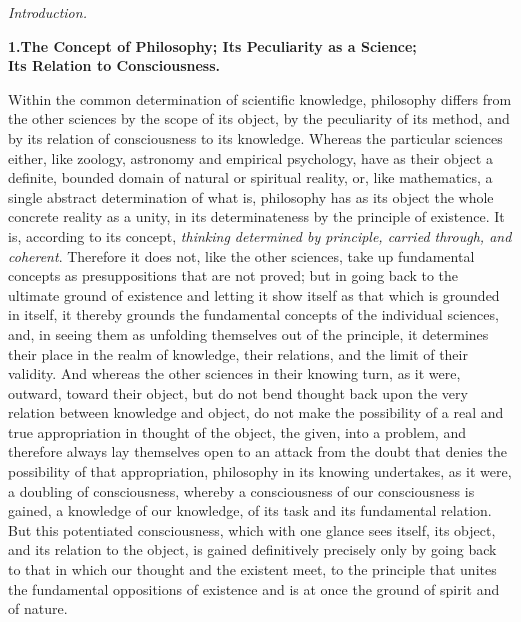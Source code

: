 \divrule

\begin{center}
{\Large\emph{Introduction.}}
\end{center}

\divrule

\begin{center}
\textbf{1.\enspace The Concept of Philosophy; Its Peculiarity as a Science;\\
Its Relation to Consciousness.}
\end{center}

Within the common determination of scientific knowledge, philosophy
differs from the other sciences by the scope of its object, by the
peculiarity of its method, and by its relation of consciousness to its
knowledge. Whereas the particular sciences either, like zoology,
astronomy and empirical psychology, have as their object a definite,
bounded domain of natural or spiritual reality, or, like mathematics, a
single abstract determination of what is, philosophy has as its object
the whole concrete reality as a unity, in its determinateness by the
principle of existence. It is, according to its concept, \emph{thinking
determined by principle, carried through, and coherent}. Therefore it
does not, like the other sciences, take up fundamental concepts as
presuppositions that are not proved; but in going back to the ultimate
ground of existence and letting it show itself as that which is grounded
in itself, it thereby grounds the fundamental concepts of the individual
sciences, and, in seeing them as unfolding themselves out of the
principle, it determines their place in the realm of knowledge, their
relations, and the limit of their validity. And whereas the other
sciences in their knowing turn, as it were, outward, toward their
object, but do not bend thought back upon the very relation between
knowledge and object, do not make the possibility of a real and true
appropriation in thought of the object, the given, into a problem, and
therefore always lay themselves open to an attack from the doubt that
denies the possibility of that appropriation, philosophy in its
knowing undertakes, as it were, a doubling of consciousness, whereby a
consciousness of our consciousness is gained, a knowledge of our
knowledge, of its task and its fundamental relation. But this
potentiated consciousness, which with one glance sees itself, its
object, and its relation to the object, is gained definitively precisely
only by going back to that in which our thought and the existent meet,
to the principle that unites the fundamental oppositions of existence
and is at once the ground of spirit and of nature.

